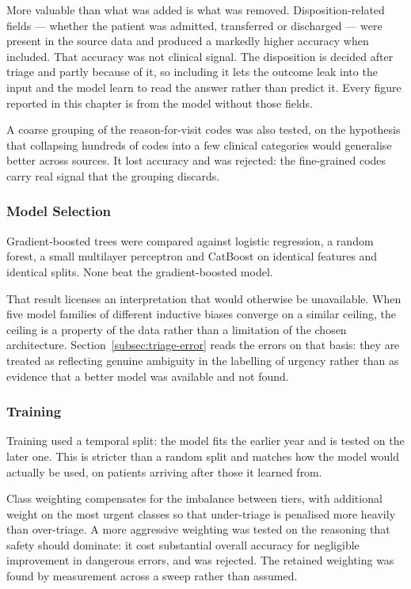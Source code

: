 More valuable than what was added is what was removed. Disposition-related fields --- whether
the patient was admitted, transferred or discharged --- were present in the source data and
produced a markedly higher accuracy when included. That accuracy was not clinical signal. The
disposition is decided after triage and partly because of it, so including it lets the outcome
leak into the input and the model learn to read the answer rather than predict it. Every figure
reported in this chapter is from the model without those fields.

A coarse grouping of the reason-for-visit codes was also tested, on the hypothesis that
collapsing hundreds of codes into a few clinical categories would generalise better across
sources. It lost accuracy and was rejected: the fine-grained codes carry real signal that the
grouping discards.

\subsubsection{Model Selection}

Gradient-boosted trees were compared against logistic regression, a random forest, a small
multilayer perceptron and CatBoost on identical features and identical splits. None beat the
gradient-boosted model.

That result licenses an interpretation that would otherwise be unavailable. When five model
families of different inductive biases converge on a similar ceiling, the ceiling is a property
of the data rather than a limitation of the chosen architecture. Section~\ref{subsec:triage-error}
reads the errors on that basis: they are treated as reflecting genuine ambiguity in the
labelling of urgency rather than as evidence that a better model was available and not found.

\subsubsection{Training}

Training used a temporal split: the model fits the earlier year and is tested on the later one.
This is stricter than a random split and matches how the model would actually be used, on
patients arriving after those it learned from.

Class weighting compensates for the imbalance between tiers, with additional weight on the most
urgent classes so that under-triage is penalised more heavily than over-triage. A more
aggressive weighting was tested on the reasoning that safety should dominate: it cost
substantial overall accuracy for negligible improvement in dangerous errors, and was rejected.
The retained weighting was found by measurement across a sweep rather than assumed.

